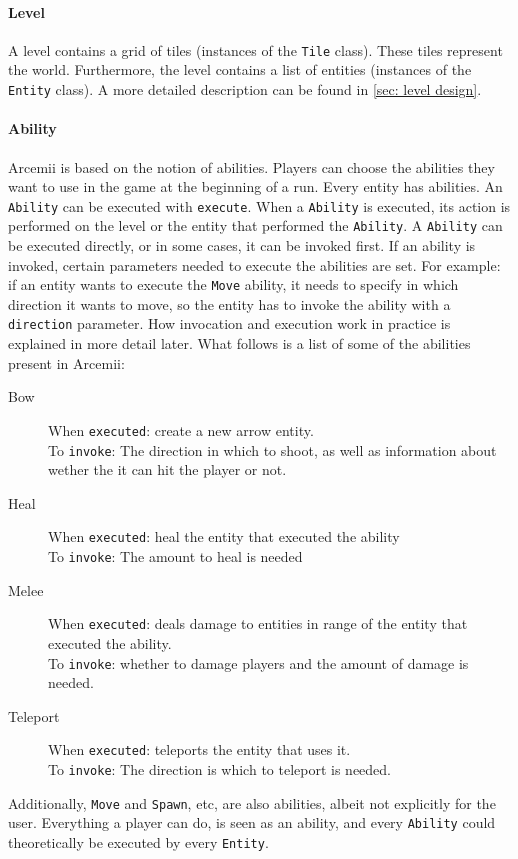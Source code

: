 \documentclass[../main.tex]{subfiles}
\begin{document}
		\paragraph{Level}
		A level contains a grid of tiles (instances of the \texttt{Tile} class). These tiles represent the world. Furthermore, the level contains a list of entities (instances of the 
		\texttt{Entity} class). A more detailed description can be found in \ref{sec: level design}.

		\paragraph{Ability}
		Arcemii is based on the notion of abilities. Players can choose the abilities they want to use in the game at the beginning of a run. Every entity has abilities. An \texttt{Ability} can be executed with \texttt{execute}. When a \texttt{Ability} is executed, its action is performed on the level or the entity that performed the \texttt{Ability}. A \texttt{Ability} can be executed directly, or in some cases, it can be invoked first. If an ability is invoked, certain parameters needed to execute the abilities are set. For example: if an entity wants to execute the \texttt{Move} ability, it needs to specify in which direction it wants to move, so the entity has to invoke the ability with a \texttt{direction} parameter. How invocation and execution work in practice is explained in more detail later. What follows is a list of some of the abilities present in Arcemii:
		\begin{description}
			\item[Bow] When \texttt{executed}: create a new arrow entity. \\
			To \texttt{invoke}: The direction in which to shoot, as well as information about wether the it can hit the player or not.
			\item[Heal] When \texttt{executed}: heal the entity that executed the ability \\
			To \texttt{invoke}: The amount to heal is needed
			\item[Melee] When \texttt{executed}: deals damage to entities in range of the entity that executed the ability.\\
			To \texttt{invoke}: whether to damage players and the amount of damage is needed.
			\item[Teleport] When \texttt{executed}: teleports the entity that uses it.\\
			To \texttt{invoke}: The direction is which to teleport is needed.
		\end{description}
		Additionally, \texttt{Move} and \texttt{Spawn}, etc, are also abilities, albeit not explicitly for the user. Everything a player can do, is seen as an ability, and every \texttt{Ability} could theoretically be executed by every \texttt{Entity}. 
		
\end{document}

